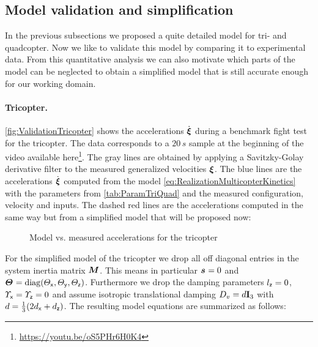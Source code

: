 \clearpage
\subsection{Model validation and simplification}
In the previous subsections we proposed a quite detailed model for tri- and quadcopter.
Now we like to validate this model by comparing it to experimental data.
From this quantitative analysis we can also motivate which parts of the model can be neglected to obtain a simplified model that is still accurate enough for our working domain.

\paragraph*{Tricopter.}
\autoref{fig:ValidationTricopter} shows the accelerations $\sysVeld$ during a benchmark fight test for the tricopter.
The data corresponds to a $20\,\unit{s}$ sample at the beginning of the video available here\footnote{\url{https://youtu.be/oS5PHr6H0K4}}.
The gray lines are obtained by applying a Savitzky-Golay derivative filter to the measured generalized velocities $\sysVel$.
The blue lines are the accelerations $\sysVeld$ computed from the model \eqref{eq:RealizationMulticopterKinetics} with the parameters from \autoref{tab:ParamTriQuad} and the measured configuration, velocity and inputs.
The dashed red lines are the accelerations computed in the same way but from a simplified model that will be proposed now:

\begin{figure}[p]
 \centering
 \footnotesize%
 
 \vspace{-20pt}
 \caption{Model vs. measured accelerations for the tricopter}
 \label{fig:ValidationTricopter}
\end{figure}

For the simplified model of the tricopter we drop all off diagonal entries in the system inertia matrix $\sysInertiaMat$.
This means in particular $\bodyCOM{}{}{} = 0$ and $\bodyMOI{}{}{} = \diag(\Jx, \Jy, \Jz)$.
Furthermore we drop the damping parameters $\lz=0$, $\sigx=\sigz=0$ and assume isotropic translational damping $D_v = \DampingSym \idMat[3]$ with $\DampingSym = \tfrac{1}{3}(2\dvx + \dvz)$.
The resulting model equations are summarized as follows:

